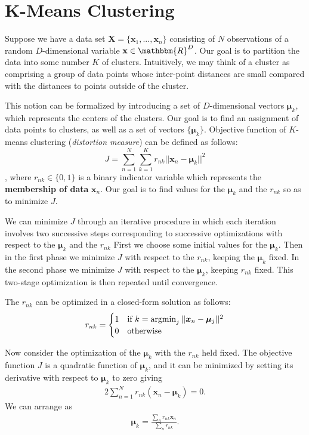 

\section{K-Means Clustering}
Suppose we have a data set $\mathbf{X} = \{\mathbf{x}_1,...,\mathbf{x}_n\}$ consisting of $N$ observations of a random $D$-dimensional variable $\mathbf{x}\in \mathbbm{R}^{D}$. Our goal is to partition the data into some number $K$ of clusters.  Intuitively, we may think of a cluster as comprising a group of data points whose inter-point distances are small compared with the distances to points outside of the cluster.

This notion can be formalized by introducing a set of $D$-dimensional vectors $\boldsymbol{\mu}_k$, which represents the centers of the clusters. Our goal is to find an assignment of data points to clusters, as well as a set of vectors $\{\boldsymbol{\mu}_k\}$. Objective function of $K$-means clustering (\textit{distortion measure}) can be defined as follows:
$$J =  \sum_{n=1}^{N}\sum_{k=1}^{K}r_{nk}||\boldsymbol{x}_n-\boldsymbol{\mu}_k||^2$$
, where $r_{nk}\in\{0,1\}$ is a binary indicator variable which represents the \textbf{membership of data} $\mathbf{x}_n$. Our goal is to find values for the $\boldsymbol{\mu}_k$ and the $r_{nk}$ so as to minimize $J$. 

We can minimize $J$ through an iterative procedure in which each iteration involves two successive steps corresponding to successive optimizations with respect to the $\boldsymbol{\mu}_k$ and the $r_{nk}$ First we choose some initial values for the $\boldsymbol{\mu}_k$. Then in the first phase we minimize $J$ with respect to the $r_{nk}$, keeping the $\boldsymbol{\mu}_k$ fixed. In the second phase we minimize $J$ with respect to the $\boldsymbol{\mu}_k$, keeping $r_{nk}$ fixed. This two-stage optimization is then repeated until convergence.

The $r_{nk}$ can be optimized in a closed-form solution as follows:
$$r_{nk}=\begin{cases}
1 & \textrm{if } k=\operatorname*{\operatorname{argmin}}_{j} ||\boldsymbol{x}_n-\boldsymbol{\mu}_j||^2\\
0 & \textrm{otherwise}
\end{cases}$$

Now consider the optimization of the $\boldsymbol{\mu}_k$ with the $r_{nk}$ held fixed. The objective function $J$ is a quadratic function of $\boldsymbol{\mu}_k$, and it can be minimized by setting its derivative with respect to $\boldsymbol{\mu}_k$ to zero giving
\begin{align*}
2\sum_{n=1}^{N}r_{nk}(\boldsymbol{x}_n-\boldsymbol{\mu}_k) = 0.
\end{align*}
We can arrange as
\begin{align*}
\boldsymbol{\mu}_k = \frac{\sum_n r_{nk}\boldsymbol{x}_n}{\sum_n r_{nk}}.
\end{align*}

